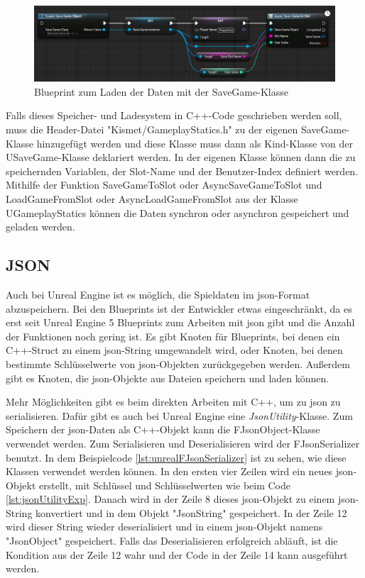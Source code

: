 \begin{figure}[htp]
    \centering
    \includegraphics[width=1\textwidth]{images/SaveGameBP.png}
    \caption{Blueprint zum Laden der Daten mit der SaveGame-Klasse\cite{unrealengineSavingLoading}}
    \label{fig:unrealSaveGameBluePrintLoad}
\end{figure}

Falls dieses Speicher- und Ladesystem in C++-Code geschrieben werden soll, muss die Header-Datei "Kismet/GameplayStatics.h" zu der eigenen SaveGame-Klasse hinzugefügt werden und diese Klasse muss dann als Kind-Klasse von der USaveGame-Klasse deklariert werden. In der eigenen Klasse können dann die zu speichernden Variablen, der Slot-Name und der Benutzer-Index definiert werden. Mithilfe der Funktion SaveGameToSlot oder AsyncSaveGameToSlot und LoadGameFromSlot oder AsyncLoadGameFromSlot aus der Klasse UGameplayStatics können die Daten synchron oder asynchron gespeichert und geladen werden.\cite{unrealengineSavingLoading}



\subsection{JSON}
Auch bei Unreal Engine ist es möglich, die Spieldaten im \ac{json}-Format abzuspeichern. Bei den Blueprints ist der Entwickler etwas eingeschränkt, da es erst seit Unreal Engine 5 Blueprints zum Arbeiten mit \ac{json} gibt und die Anzahl der Funktionen noch gering ist. Es gibt Knoten für Blueprints, bei denen ein C++-Struct zu einem \ac{json}-String umgewandelt wird, oder Knoten, bei denen bestimmte Schlüsselwerte von \ac{json}-Objekten zurückgegeben werden. Außerdem gibt es Knoten, die \ac{json}-Objekte aus Dateien speichern und laden können.\cite{unrealengineJsonBlueprint}

Mehr Möglichkeiten gibt es beim direkten Arbeiten mit C++, um zu \ac{json} zu serialisieren. Dafür gibt es auch bei Unreal Engine eine \textit{JsonUtility}-Klasse. Zum Speichern der \ac{json}-Daten als C++-Objekt kann die FJsonObject-Klasse verwendet werden. Zum Serialisieren und Deserialisieren wird der FJsonSerializer benutzt. In dem Beispielcode \ref{lst:unrealFJsonSerializer} ist zu sehen, wie diese Klassen verwendet werden können. In den ersten vier Zeilen wird ein neues \ac{json}-Objekt erstellt, mit Schlüssel und Schlüsselwerten wie beim Code \ref{lst:jsonUtilityExp}. Danach wird in der Zeile 8 dieses \ac{json}-Objekt zu einem \ac{json}-String konvertiert und in dem Objekt "JsonString" gespeichert. In der Zeile 12 wird dieser String wieder deserialisiert und in einem \ac{json}-Objekt namens "JsonObject" gespeichert. Falls das Deserialisieren erfolgreich abläuft, ist die Kondition aus der Zeile 12 wahr und der Code in der Zeile 14 kann ausgeführt werden.\cite{unrealengineFJsonObject}\cite{unrealengineFJsonSerializer}\cite{wraiythUsingJson1}\cite{wraiythUsingJson2}

